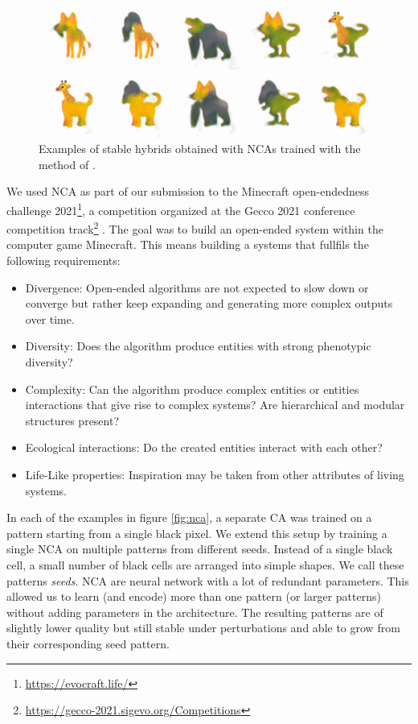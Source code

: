 \begin{figure}[htbp]
  \centering
  \includegraphics[width=.8\linewidth]{figures/nca_hybrids.png}
  \caption{Examples of stable hybrids obtained with \acp{NCA} trained with the
    method of \parencite{cisnerosOpenendedCreationHybrid2021}.}
  \label{fig:nca_hybrid}
\end{figure}


We used \ac{NCA} as part of our submission to the Minecraft open-endedness
challenge 2021\footnote{\url{https://evocraft.life/}}, a competition organized
at the Gecco 2021 conference competition
track\footnote{\url{https://gecco-2021.sigevo.org/Competitions}}
\parencite{cisnerosOpenendedCreationHybrid2021}. The goal was to build an
open-ended system within the computer game Minecraft. This means building a
systems that fullfils the following requirements:

\begin{itemize}
  \item Divergence: Open-ended algorithms are not expected to slow down or
        converge but rather keep expanding and generating more complex outputs
        over time.

  \item Diversity: Does the algorithm produce entities with strong phenotypic
        diversity?

  \item Complexity: Can the algorithm produce complex entities or entities
        interactions that give rise to complex systems? Are hierarchical and
        modular structures present?

  \item Ecological interactions: Do the created entities interact with each
        other?

  \item Life-Like properties: Inspiration may be taken from other attributes of
        living systems.
\end{itemize}

In each of the examples in figure \ref{fig:nca}, a separate \ac{CA} was trained
on a pattern starting from a single black pixel. We extend this setup by
training a single \ac{NCA} on multiple patterns from different seeds. Instead of
a single black cell, a small number of black cells are arranged into simple
shapes. We call these patterns \emph{seeds}. \ac{NCA} are neural network with a
lot of redundant parameters. This allowed us to learn (and encode) more than one
pattern (or larger patterns) without adding parameters in the architecture. The
resulting patterns are of slightly lower quality but still stable under
perturbations and able to grow from their corresponding seed pattern.

